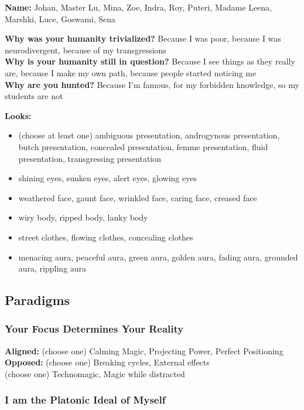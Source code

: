 \documentclass[
  oneside,
  statementpaper,
  9pt]{memoir}
\begin{document}
\textbf{Name:} Johan, Master Lu, Mina, Zoe, Indra, Roy, Puteri, Madame
Leena, Marshki, Luce, Goswami, Sena

\textbf{Why was your humanity trivialized?} Because I was poor, because
I was neurodivergent, because of my transgressions\\
\textbf{Why is your humanity still in question?} Because I see things as
they really are, because I make my own path, because people started
noticing me\\
\textbf{Why are you hunted?} Because I'm famous, for my forbidden
knowledge, so my students are not

\textbf{Looks:}

\begin{itemize}
\tightlist
\item
  (choose at least one) ambiguous presentation, androgynous
  presentation, butch presentation, concealed presentation, femme
  presentation, fluid presentation, transgressing presentation
\item
  shining eyes, sunken eyes, alert eyes, glowing eyes
\item
  weathered face, gaunt face, wrinkled face, caring face, creased face
\item
  wiry body, ripped body, lanky body
\item
  street clothes, flowing clothes, concealing clothes
\item
  menacing aura, peaceful aura, green aura, golden aura, fading aura,
  grounded aura, rippling aura
\end{itemize}

\hypertarget{paradigms-3}{%
\subsection{Paradigms}\label{paradigms-3}}

\hypertarget{your-focus-determines-your-reality}{%
\subsubsection{Your Focus Determines Your
Reality}\label{your-focus-determines-your-reality}}

\textbf{Aligned:} (choose one) Calming Magic, Projecting Power, Perfect
Positioning\\
\textbf{Opposed:} (choose one) Breaking cycles, External effects\\
(choose one) Technomagic, Magic while distracted

\hypertarget{i-am-the-platonic-ideal-of-myself}{%
\subsubsection{I am the Platonic Ideal of
Myself}\label{i-am-the-platonic-ideal-of-myself}}
\end{document}
